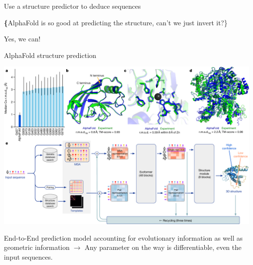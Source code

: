 \documentclass[presentation,smaller]{beamer}
\begin{document}
\begin{frame}[label={sec:orgf5c13d3}]{Use a structure predictor to deduce sequences}
\begin{center}
\Large \textbf\{AlphaFold is so good at predicting the structure, can't we just
invert it?\}

Yes, we can!
\end{center}
\end{frame}

\begin{frame}[label={sec:orge34d337}]{AlphaFold structure prediction}
\begin{center}
\includegraphics[width=.9\linewidth]{./img/AlphaFold_2.png}
\end{center}

End-to-End prediction model accounting for evolutionary information as well as
geometric information \(\rightarrow\) Any parameter on the way is differentiable,
even the input sequences.
\end{frame}
\end{document}
